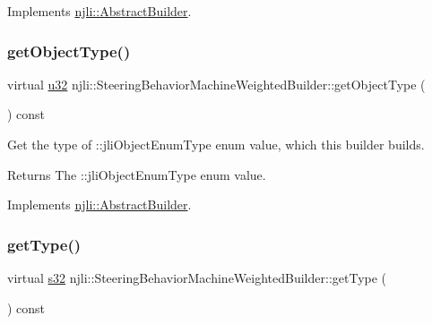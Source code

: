 Implements \mbox{\hyperlink{classnjli_1_1_abstract_builder_a902f73ea78031b06aca183a417f3413b}{njli\+::\+Abstract\+Builder}}.

\mbox{\label{classnjli_1_1_steering_behavior_machine_weighted_builder_a7aa7a8620c6f8990966ca4076e1cbffa}} 
\subsubsection{\texorpdfstring{get\+Object\+Type()}{getObjectType()}}
{\footnotesize\ttfamily virtual \mbox{\hyperlink{_util_8h_a10e94b422ef0c20dcdec20d31a1f5049}{u32}} njli\+::\+Steering\+Behavior\+Machine\+Weighted\+Builder\+::get\+Object\+Type (\begin{DoxyParamCaption}{ }\end{DoxyParamCaption}) const\hspace{0.3cm}{\ttfamily [virtual]}}

Get the type of \+::jli\+Object\+Enum\+Type enum value, which this builder builds.

\begin{DoxyReturn}{Returns}
The \+::jli\+Object\+Enum\+Type enum value. 
\end{DoxyReturn}


Implements \mbox{\hyperlink{classnjli_1_1_abstract_builder_a0f2d344fcf697b167f4f2b1122b5fb33}{njli\+::\+Abstract\+Builder}}.

\mbox{\label{classnjli_1_1_steering_behavior_machine_weighted_builder_acb1572c7c6a1b2775f27af36a57eae0f}} 
\subsubsection{\texorpdfstring{get\+Type()}{getType()}}
{\footnotesize\ttfamily virtual \mbox{\hyperlink{_util_8h_aa62c75d314a0d1f37f79c4b73b2292e2}{s32}} njli\+::\+Steering\+Behavior\+Machine\+Weighted\+Builder\+::get\+Type (\begin{DoxyParamCaption}{ }\end{DoxyParamCaption}) const\hspace{0.3cm}{\ttfamily [virtual]}}

